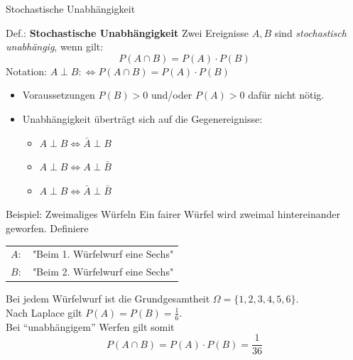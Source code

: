\documentclass[
  10pt,
  ignorenonframetext,
]{beamer}
\providecommand{\tightlist}{%
  \setlength{\itemsep}{0pt}\setlength{\parskip}{0pt}}
\begin{document}
\begin{frame}{Stochastische Unabhängigkeit}
\label{stochastische-unabhuxe4ngigkeit-1}
\begin{block}{Def.: \textbf{Stochastische Unabhängigkeit}}
\label{def.-stochastische-unabhuxe4ngigkeit}
Zwei Ereignisse \(A, B\) sind \emph{stochastisch unabhängig}, wenn gilt:
\[ P(A \cap B) = P(A) \cdot P(B)\] Notation:
\(A \perp B :\iff P(A \cap B) = P(A) \cdot P(B)\)
\end{block}

\begin{itemize}
\tightlist
\item
  Voraussetzungen \(P(B) > 0\) und/oder \(P(A) > 0\) dafür nicht nötig.
\item
  Unabhängigkeit überträgt sich auf die Gegenereignisse:

  \begin{itemize}
  \tightlist
  \item
    \(A \perp B \iff \bar{A} \perp B\)
  \item
    \(A \perp B \iff A \perp \bar B\)
  \item
    \(A \perp B \iff \bar A \perp \bar B\)
  \end{itemize}
\end{itemize}

\end{frame}

\begin{frame}{Beispiel: Zweimaliges Würfeln}
\label{beispiel-zweimaliges-wuxfcrfeln}
Ein fairer Würfel wird zweimal hintereinander geworfen. Definiere

\begin{tabular}{ll}
$A:$ & "Beim 1. Würfelwurf eine Sechs" \\
$B:$ & "Beim 2. Würfelwurf eine Sechs"
\end{tabular}

Bei jedem Würfelwurf ist die Grundgesamtheit
\(\Omega = \{1,2,3,4,5,6 \}\).\\
Nach Laplace gilt \(P(A) = P(B) = \frac{1}{6}\).\\
Bei ``unabhängigem'' Werfen gilt somit \[
P(A \cap B) = P(A) \cdot P(B) = \frac{1}{36}
\]
\end{frame}
\end{document}
